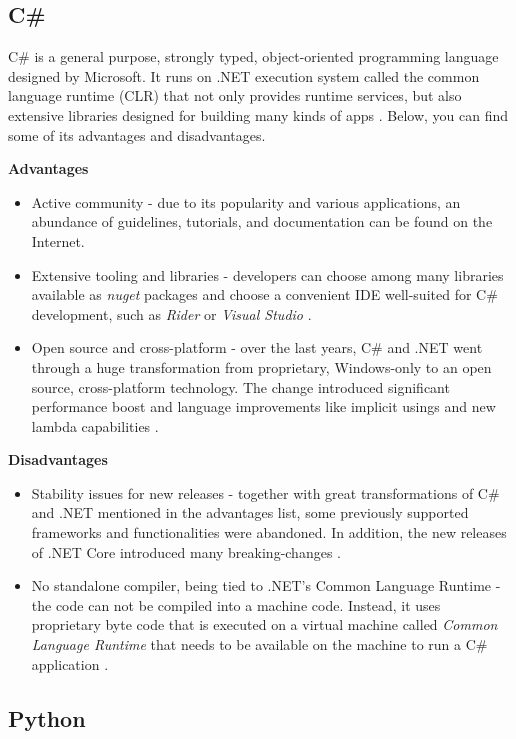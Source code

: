 \subsection{C\#}
C\#\cite{c-sharp-tour} is a general purpose, strongly typed, object-oriented programming language designed by Microsoft. It runs on .NET execution system called the common language runtime (CLR) that not only provides runtime services, but also extensive libraries designed for building many kinds of apps . Below, you can find some of its advantages and disadvantages.

\textbf{Advantages}
\begin{itemize}
    \item Active community - due to its popularity and various applications, an abundance of guidelines, tutorials, and documentation can be found on the Internet.
    \item Extensive tooling and libraries - developers can choose among many libraries available as \textit{nuget}\cite{nuget} packages and choose a convenient IDE well-suited for C\# development, such as \textit{Rider} or \textit{Visual Studio}  \cite{net-tools}.
    \item Open source and cross-platform - over the last years, C\# and .NET went through a huge transformation from proprietary, Windows-only to an open source, cross-platform technology. The change introduced significant performance boost and language improvements like implicit usings and new lambda capabilities \cite{net6}. 
\end{itemize}

\textbf{Disadvantages}
\begin{itemize}
    \item Stability issues for new releases - together with great transformations of C\# and .NET mentioned in the advantages list, some previously supported frameworks and functionalities were abandoned. In addition, the new releases of .NET Core introduced many breaking-changes \cite{net-breaking-changes}. 
    \item No standalone compiler, being tied to .NET's Common Language Runtime - the code can not be compiled into a machine code. Instead, it uses proprietary byte code that is executed on a virtual machine called \textit{Common Language Runtime} that needs to be available on the machine to run a C\# application \cite{c-sharp-tour}.
\end{itemize}

\subsection{Python}

